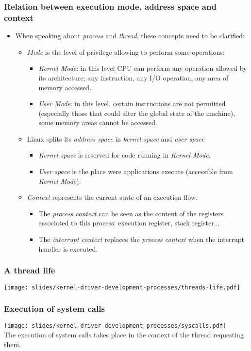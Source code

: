 \begin{frame}
  \frametitle{Relation between execution mode, address space and context}
  \begin{itemize}
  \item When speaking about \emph{process} and \emph{thread}, these
    concepts need to be clarified:
    \begin{itemize}
    \item \emph{Mode} is the level of privilege allowing to perform
      some operations:
      \begin{itemize}
      \item \emph{Kernel Mode}: in this level CPU can perform any
        operation allowed by its architecture; any instruction, any
        I/O operation, any area of memory accessed.
      \item \emph{User Mode}: in this level, certain instructions are
        not permitted (especially those that could alter the global
        state of the machine), some memory areas cannot be accessed.
      \end{itemize}
    \item Linux splits its \emph{address space} in \emph{kernel space}
      and \emph{user space}
      \begin{itemize}
      \item \emph{Kernel space} is reserved for code running in
        \emph{Kernel Mode}.
      \item \emph{User space} is the place were applications execute
        (accessible from \emph{Kernel Mode}).
      \end{itemize}
    \item \emph{Context} represents the current state of an execution flow.
      \begin{itemize}
      \item The \emph{process context} can be seen as the content of
        the registers associated to this process: execution register,
        stack register...
      \item The \emph{interrupt context} replaces the \emph{process
          context} when the interrupt handler is executed.
      \end{itemize}
    \end{itemize}
  \end{itemize}
\end{frame}

\begin{frame}
  \frametitle{A thread life}
  \begin{center}
    \texttt{[image: slides/kernel-driver-development-processes/threads-life.pdf]}
  \end{center}
\end{frame}

\begin{frame}
  \frametitle{Execution of system calls}
  \begin{center}
    \texttt{[image: slides/kernel-driver-development-processes/syscalls.pdf]}\\
    The execution of system calls takes place in the context of the
    thread requesting them.
  \end{center}
\end{frame}

